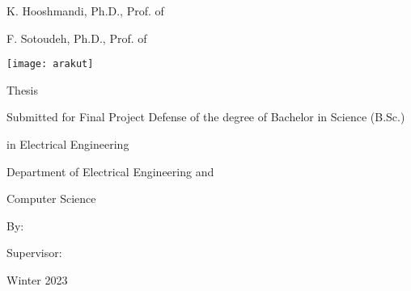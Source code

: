 \begin{latin}
\begin{center}
\dotfill K. Hooshmandi, Ph.D., Prof. of \insten

\dotfill F. Sotoudeh, Ph.D., Prof. of \insten

\vspace{5mm}\dateen

\clearpage
\thispagestyle{empty}
\onehalfspacing

\texttt{[image: arakut]}

\begin{bold}
\vspace{-5mm}\small \insten\par
\vspace{1cm}\Large\titleen\par
\end{bold}

\vspace{2cm}\normalsize Thesis\par Submitted for Final Project Defense of the degree of Bachelor in Science (B.Sc.)\par in Electrical Engineering\par \insten\par Department of Electrical Engineering and\par Computer Science\par
\vspace{2cm}\large By:\par \Large\textbf\authoren\par
\vspace{2cm}\large Supervisor:\par \Large\textbf\supervisoren\par
\vspace{25mm}\normalsize Winter 2023\par
\end{center}

\end{latin}
